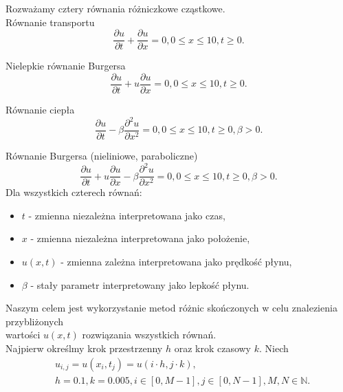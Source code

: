 \documentclass[12pt, a4paper]{article}
\begin{document}
Rozważamy cztery równania różniczkowe cząstkowe.\\

Równanie transportu
\begin{equation}
\frac{\partial u}{\partial t}+\frac{\partial u}{\partial x}=0, 0\leqslant x\leqslant10, t\geqslant0.
\end{equation}
\vspace{0.5cm}

Nielepkie równanie Burgersa
\begin{equation}
\frac{\partial u}{\partial t}+u\frac{\partial u}{\partial x}=0, 0\leqslant x\leqslant10, t\geqslant0.
\end{equation}
\vspace{0.5cm}

Równanie ciepła
\begin{equation}
\frac{\partial u}{\partial t}-\beta\frac{\partial^{2} u}{\partial x^{2}}=0, 0\leqslant x\leqslant10, t\geqslant0, \beta>0.
\end{equation}
\vspace{0.5cm}

Równanie Burgersa (nieliniowe, paraboliczne)
\begin{equation}
\frac{\partial u}{\partial t}+u\frac{\partial u}{\partial x}-\beta\frac{\partial^{2} u}{\partial x^{2}}=0, 0\leqslant x\leqslant10, t\geqslant0, \beta>0.
\end{equation}
Dla wszystkich czterech równań:\\
\begin{itemize}
\item $t$ - zmienna niezależna interpretowana jako czas,
\item $x$ - zmienna niezależna interpretowana jako położenie,
\item $u(x,t)$ - zmienna zależna interpretowana jako prędkość płynu,
\item $\beta$ - stały parametr interpretowany jako lepkość płynu.
\end{itemize}
\vspace{0.5cm}

Naszym celem jest wykorzystanie metod różnic skończonych w celu znalezienia przybliżonych\\
wartości $u(x,t)$ rozwiązania wszystkich równań.\\
Najpierw określmy krok przestrzenny $h$ oraz krok czasowy $k$. Niech
\begin{equation}
\begin{split}
& u_{i,j}=u(x_{i},t_{j})=u(i\cdot h,j\cdot k),\\
& h=0.1, k=0.005, i\in[0,M-1], j\in[0,N-1], M,N\in\mathbb{N}.
\end{split}
\end{equation}
\end{document}
